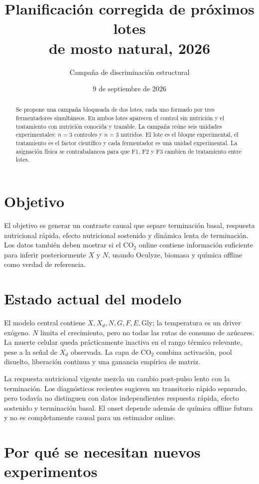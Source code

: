 \documentclass[11pt,a4paper]{article}
\title{Planificación corregida de próximos lotes\\de mosto natural, 2026}
\author{Campaña de discriminación estructural}
\date{9 de septiembre de 2026}
\begin{document}
\maketitle

\begin{abstract}
Se propone una campaña bloqueada de dos lotes, cada uno formado por tres
fermentadores simultáneos. En ambos lotes aparecen el control sin nutrición y el
tratamiento con nutrición conocida y trazable. La campaña reúne seis unidades
experimentales: \(n=3\) controles y \(n=3\) nutridos. El lote es el bloque
experimental, el tratamiento es el factor científico y cada fermentador es una
unidad experimental. La asignación física se contrabalancea para que F1, F2 y F3
cambien de tratamiento entre lotes.
\end{abstract}

\section{Objetivo}

El objetivo es generar un contraste causal que separe terminación basal,
respuesta nutricional rápida, efecto nutricional sostenido y dinámica lenta de
terminación. Los datos también deben mostrar si el CO$_2$ online contiene
información suficiente para inferir posteriormente \(X\) y \(N\), usando
Oculyze, biomasa y química offline como verdad de referencia.

\section{Estado actual del modelo}

El modelo central contiene \(X,X_d,N,G,F,E,\mathrm{Gly}\); la temperatura es un
driver exógeno. \(N\) limita el crecimiento, pero no todas las rutas de consumo
de azúcares. La muerte celular queda prácticamente inactiva en el rango térmico
relevante, pese a la señal de \(X_d\) observada. La capa de CO$_2$ combina
activación, pool disuelto, liberación continua y una ganancia empírica de matriz.

La respuesta nutricional vigente mezcla un cambio post-pulso lento con la
terminación. Los diagnósticos recientes sugieren un transitorio rápido separado,
pero todavía no distinguen con datos independientes respuesta rápida, efecto
sostenido y terminación basal. El onset depende además de química offline futura
y no es completamente causal para un estimador online.

\section{Por qué se necesitan nuevos experimentos}
\end{document}
